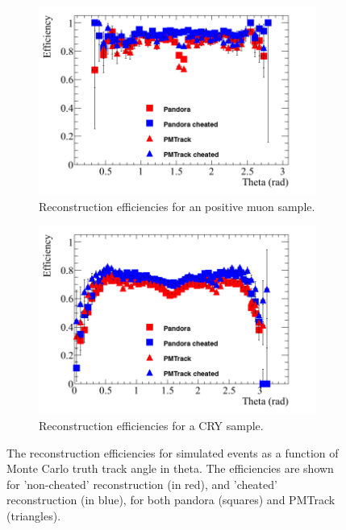 \begin{figure}[h!]
  \centering
  \begin{subfigure}{0.48\textwidth}
    \centering
    \includegraphics[width=\textwidth]{Effic_AntiMuon_500V_All_Theta}
    \caption{Reconstruction efficiencies for an positive muon sample.}
    \label{fig:SimEffic_Theta_AMu}
  \end{subfigure}%
  \hspace{0.03\textwidth}%
  \begin{subfigure}{0.48\textwidth}
    \centering
    \includegraphics[width=\textwidth]{Effic_Cosmics_500V_All_Theta}
    \caption{Reconstruction efficiencies for a CRY sample.}
    \label{fig:SimEffic_Theta_CRY}
  \end{subfigure}
  \caption[The reconstruction efficiencies for simulated events as a function of Monte Carlo truth track angle in theta.]
          {The reconstruction efficiencies for simulated events as a function of Monte Carlo truth track angle in theta. The efficiencies are shown for 'non-cheated' reconstruction (in red), and 'cheated' reconstruction (in blue), for both pandora (squares) and PMTrack (triangles).}
          \label{fig:SimEffic_Theta}
\end{figure}

